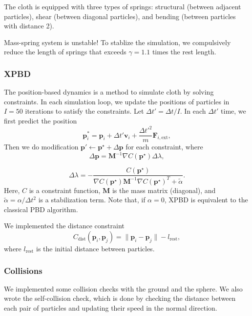 The cloth is equipped with three types of springs: structural (between adjacent particles), shear (between diagonal particles), and bending (between particles with distance 2). 

Mass-spring system is unstable! To stablize the simulation, we compulsively reduce the length of springs that exceeds $\gamma=1.1$ times the rest length.

\subsubsection{XPBD}

The position-based dynamics is a method to simulate cloth by solving constraints. In each simulation loop, we update the positions of particles in $I=50$ iterations to satisfy the constraints. Let $\Delta t'=\Delta t/I$. In each $\Delta t'$ time, we first predict the position
\begin{equation}
  \label{eq-xpbd-1}
\mathbf{p}_i^*=\mathbf{p}_i+\Delta t'\mathbf{v}_i+\frac{\Delta t'^2}{m}\mathbf{F}_{i,\text{ext}},
\end{equation}
Then we do modification $\mathbf{p}'\leftarrow\mathbf{p}^\star +\Delta \mathbf{p}$ for each constraint, where
\begin{equation}
  \label{eq-xpbd-2}
\Delta \mathbf{p}=\mathbf{M}^{-1} \nabla C(\mathbf{p}^\star)\Delta \lambda,
\end{equation}

\begin{equation}
  \label{eq-xpbd-3}
\Delta \lambda = -\frac{C(\mathbf{p}^\star)}{\nabla C(\mathbf{p}^\star)\mathbf{M}^{-1}\nabla C(\mathbf{p}^\star)^T + \tilde \alpha}.
\end{equation}
Here, $C$ is a constraint function, $\mathbf{M}$ is the mass matrix (diagonal), and $\tilde \alpha=\alpha/\Delta t^2$ is a stabilization term. Note that, if $\alpha=0$, XPBD is equivalent to the classical PBD algorithm.

We implemented the distance constraint
\begin{equation}
  \label{eq-xpbd-4}
C_{\text{dist}}(\mathbf{p}_i,\mathbf{p}_j)=\|\mathbf{p}_i-\mathbf{p}_j\|-l_{\text{rest}},
\end{equation}
where $l_{\text{rest}}$ is the initial distance between particles.

\subsubsection{Collisions} We implemented some collision checks with the ground and the sphere. We also wrote the self-collision check, which is done by checking the distance between each pair of particles and updating their speed in the normal direction.

